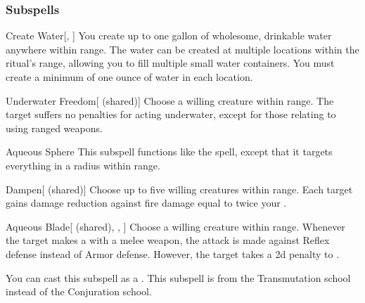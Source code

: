 \subsubsection{Subspells}


\begin{ability}[\nth{1}]{Create Water}[, ]
You create up to one gallon of wholesome, drinkable water anywhere within \rngclose range.
The water can be created at multiple locations within the ritual's range, allowing you to fill multiple small water containers.
You must create a minimum of one ounce of water in each location.
\end{ability}
\vspace{0.25em}


\begin{ability}[\nth{1}]{Underwater Freedom}[ (shared)]
Choose a willing creature within \rngclose range.
The target suffers no penalties for acting underwater, except for those relating to using ranged weapons.
\end{ability}
\vspace{0.25em}


\begin{ability}[\nth{2}]{Aqueous Sphere}
This subspell functions like the  spell, except that it targets everything in a \areasmall radius within \rngclose range.
\end{ability}
\vspace{0.25em}


\begin{ability}[\nth{2}]{Dampen}[ (shared)]
Choose up to five willing creatures within \rngclose range.
Each target gains damage reduction against fire damage equal to twice your .
\end{ability}
\vspace{0.25em}


\begin{ability}[\nth{3}]{Aqueous Blade}[ (shared), , ]
Choose a willing creature within \rngclose range.
Whenever the target makes a  with a melee weapon, the attack is made against Reflex defense instead of Armor defense.
However, the target takes a \minus2d penalty to .

You can cast this subspell as a .
This subspell is from the Transmutation school instead of the Conjuration school.
\end{ability}
\vspace{0.25em}


